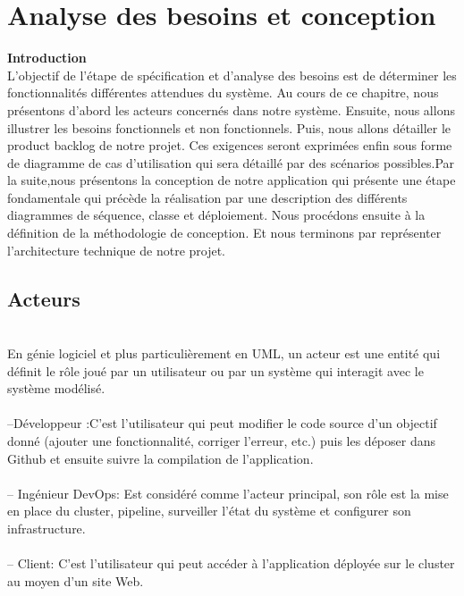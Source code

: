 
\chapter{  Analyse des besoins et conception}

\textbf{\huge Introduction}\\[0.5cm] 

L'objectif de l'étape de spécification et d'analyse des besoins est de déterminer les fonctionnalités différentes attendues du système. Au cours de ce chapitre, nous présentons d'abord les acteurs concernés dans notre système. Ensuite, nous allons illustrer les besoins fonctionnels et non fonctionnels. Puis, nous allons détailler le product backlog de notre projet. Ces exigences seront exprimées enfin sous forme de diagramme de cas d'utilisation qui sera détaillé par des scénarios possibles.Par la suite,nous présentons la conception de notre application qui présente une étape fondamentale qui précède la réalisation par une description des différents diagrammes de séquence, classe et déploiement. Nous procédons ensuite à la définition de la méthodologie de conception. Et nous terminons par représenter l'architecture technique de notre projet.
\section{\LARGE Acteurs}
\texttt{}\\[0.1cm]
 En génie logiciel et plus particulièrement en UML, un acteur est une entité qui définit le rôle joué par un utilisateur ou par un système qui interagit avec le système modélisé\cite{12}.\\\texttt{}\\[0.01cm]%
 \textsf{\selectfont{}--Développeur :}C'est l'utilisateur qui peut modifier le code source d'un objectif donné (ajouter une fonctionnalité, corriger l'erreur, etc.) puis les déposer dans Github et ensuite suivre la compilation de l'application.\\\texttt{}\\[0.01cm]
\textsf{\selectfont{}-- Ingénieur DevOps:} Est considéré comme l'acteur principal, son rôle est la mise en place du cluster, pipeline, surveiller l'état du système et configurer son infrastructure.\\\texttt{}\\[0.01cm]
\textsf{\selectfont{}-- Client:} C'est l'utilisateur qui peut accéder à l'application déployée sur le cluster au moyen d'un site Web.\\\texttt{}\\[0.01cm]


